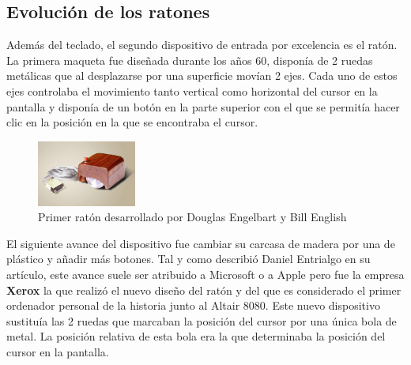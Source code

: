 \subsection{Evoluci\'on de los ratones}

Adem\'as del teclado, el segundo dispositivo de entrada por excelencia es el rat\'on. La primera maqueta fue dise\~nada durante los a\~nos 60, dispon\'ia de 2 ruedas met\'alicas que al desplazarse por una superficie mov\'ian 2 ejes. Cada uno de estos ejes controlaba el movimiento tanto vertical como horizontal del cursor en la pantalla y dispon\'ia de un bot\'on en la parte superior con el que se permit\'ia hacer clic en la posici\'on en la que se encontraba el cursor.\\

\begin{figure}[h]
\centering
\includegraphics[width=0.29\textwidth]{./Imagenes/Bitmap/Primer_raton.jpg}
\caption{Primer rat\'on desarrollado por Douglas Engelbart y Bill English}
\label{Fig:primerraton}
\end{figure}

El siguiente avance del dispositivo fue cambiar su carcasa de madera por una de pl\'astico y a\~nadir m\'as botones. Tal y como describi\'o Daniel Entrialgo\cite{xerox} en su art\'iculo, este avance suele ser atribuido a Microsoft o a Apple pero fue la empresa \textbf{Xerox} la que realiz\'o el nuevo dise\~no del rat\'on y del que es considerado el primer ordenador personal de la historia junto al Altair 8080. Este nuevo dispositivo sustitu\'ia las 2 ruedas que marcaban la posici\'on del cursor por una \'unica bola de metal. La posici\'on relativa de esta bola era la que determinaba la posici\'on del cursor en la pantalla. 

